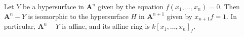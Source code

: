 Let $Y$ be a hypersurface in $\mathbf{A}^n$ given by the equation $f(x_1, \ldots, x_n) = 0$. Then $\mathbf{A}^n - Y$ is isomorphic to the hypersurface $H$ in $\mathbf{A}^{n+1}$ given by $x_{n+1}f = 1$. In particular, $\mathbf{A}^n - Y$ is affine, and its affine ring is $k[x_1, \ldots, x_n]_f$.
